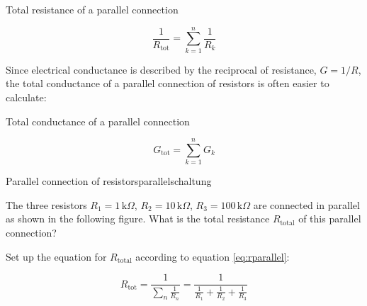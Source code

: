 \begin{frame}
{		\begin{Key point}{Total resistance of a parallel connection}
			
			\begin{equation}
				\frac{1}{R_\mathrm{tot}} = \sum_{k=1}^{n} \frac{1}{R_k}
				\label{eq:rparallel}
			\end{equation}
		\end{Key point}
		
		
		Since electrical conductance is described by the reciprocal of resistance, $G=1/R$, the total conductance of a 
		parallel connection of resistors is often easier to calculate:
		
		
		
		\begin{Key point}{Total conductance of a parallel connection}
			
			\begin{equation}
				G_\mathrm{tot} = \sum_{k=1}^{n} G_k 
			\end{equation}
		\end{Key point}
		
		\begin{expl}{Parallel connection of resistors}{parallelschaltung}
			
			The three resistors $R_1 = 1 \, \mathrm{k}\Omega$, $R_2 = 10 \, \mathrm{k}\Omega$, $R_3 = 100 \, \mathrm{k}\Omega$
			are connected in parallel as shown in the following figure. What is the total resistance $R_\mathrm{total}$ of this 
			parallel connection?
			
			
			\begin{center}


				
				
			\end{center}
			
			Set up the equation for $R_\mathrm{total}$ according to equation \ref{eq:rparallel}:
			
			
			
			\begin{equation*}
				R_\mathrm{tot} = \frac{1}{\sum_{n} \frac{1}{R_n}} = \frac{1}{\frac{1}{R_1} + \frac{1}{R_2}+ \frac{1}{R_3}}
			\end{equation*}
			

\end{expl}}
\end{frame}

